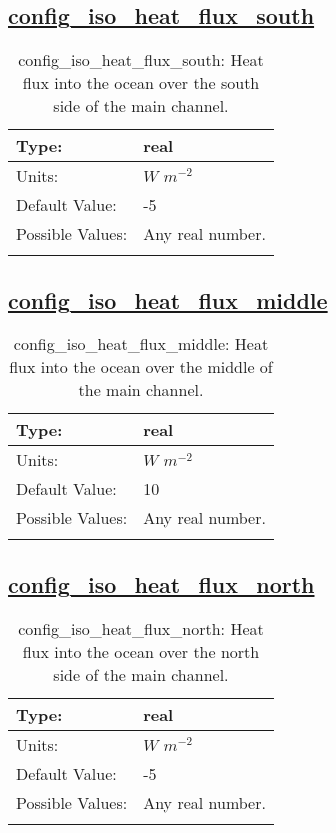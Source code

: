 \subsection[config\_iso\_heat\_flux\_south]{\hyperref[sec:nm_tab_iso]{config\_iso\_heat\_flux\_south}}
\label{subsec:nm_sec_config_iso_heat_flux_south}
\begin{center}
\begin{longtable}{| p{2.0in} || p{4.0in} |}
    \hline
    Type: & real \\
    \hline
    Units: & $W$ $m^{-2}$ \\
    \hline
    Default Value: & -5 \\
    \hline
    Possible Values: & Any real number. \\
    \hline
    \caption{config\_iso\_heat\_flux\_south: Heat flux into the ocean over the south side of the main channel.}
\end{longtable}
\end{center}
\subsection[config\_iso\_heat\_flux\_middle]{\hyperref[sec:nm_tab_iso]{config\_iso\_heat\_flux\_middle}}
\label{subsec:nm_sec_config_iso_heat_flux_middle}
\begin{center}
\begin{longtable}{| p{2.0in} || p{4.0in} |}
    \hline
    Type: & real \\
    \hline
    Units: & $W$ $m^{-2}$ \\
    \hline
    Default Value: & 10 \\
    \hline
    Possible Values: & Any real number. \\
    \hline
    \caption{config\_iso\_heat\_flux\_middle: Heat flux into the ocean over the middle of the main channel.}
\end{longtable}
\end{center}
\subsection[config\_iso\_heat\_flux\_north]{\hyperref[sec:nm_tab_iso]{config\_iso\_heat\_flux\_north}}
\label{subsec:nm_sec_config_iso_heat_flux_north}
\begin{center}
\begin{longtable}{| p{2.0in} || p{4.0in} |}
    \hline
    Type: & real \\
    \hline
    Units: & $W$ $m^{-2}$ \\
    \hline
    Default Value: & -5 \\
    \hline
    Possible Values: & Any real number. \\
    \hline
    \caption{config\_iso\_heat\_flux\_north: Heat flux into the ocean over the north side of the main channel.}
\end{longtable}
\end{center}
